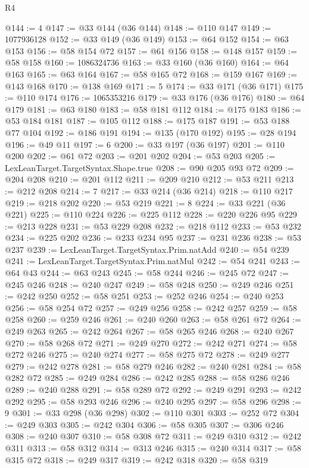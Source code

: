 \begin{lexlean}{R4}
\begin{coremodule}
@144 := 4
@147 := @33 @144 (@36 @144)
@148 := @110 @147
@149 := 1077936128
@152 := @33 @149 (@36 @149)
@153 := @64 @152
@154 := @63 @153
@156 := @58 @154 @72
@157 := @61 @156
@158 := @148 @157
@159 := @58 @158
@160 := 1086324736
@163 := @33 @160 (@36 @160)
@164 := @64 @163
@165 := @63 @164
@167 := @58 @165 @72
@168 := @159 @167
@169 := @143 @168
@170 := @138 @169
@171 := 5
@174 := @33 @171 (@36 @171)
@175 := @110 @174
@176 := 1065353216
@179 := @33 @176 (@36 @176)
@180 := @64 @179
@181 := @63 @180
@183 := @58 @181 @112
@184 := @175 @183
@186 := @53 @184 @181
@187 := @105 @112
@188 := @175 @187
@191 := @53 @188 @77 @104
@192 := @186 @191
@194 := @135 (@170 @192)
@195 := @28 @194
@196 := @49 @11
@197 := 6
@200 := @33 @197 (@36 @197)
@201 := @110 @200
@202 := @61 @72
@203 := @201 @202
@204 := @53 @203
@205 := LexLeanTarget.TargetSyntax.Shape.true
@208 := @90 @205 @93 @72
@209 := @204 @208
@210 := @201 @112
@211 := @209 @210
@212 := @53 @211
@213 := @212 @208
@214 := 7
@217 := @33 @214 (@36 @214)
@218 := @110 @217
@219 := @218 @202
@220 := @53 @219
@221 := 8
@224 := @33 @221 (@36 @221)
@225 := @110 @224
@226 := @225 @112
@228 := @220 @226 @95
@229 := @213 @228
@231 := @53 @229 @208
@232 := @218 @112
@233 := @53 @232
@234 := @225 @202
@236 := @233 @234 @95
@237 := @231 @236
@238 := @53 @237
@239 := LexLeanTarget.TargetSyntax.Prim.natAdd
@240 := @54 @239
@241 := LexLeanTarget.TargetSyntax.Prim.natMul
@242 := @54 @241
@243 := @64 @43
@244 := @63 @243
@245 := @58 @244
@246 := @245 @72
@247 := @245 @246
@248 := @240 @247
@249 := @58 @248
@250 := @249 @246
@251 := @242 @250
@252 := @58 @251
@253 := @252 @246
@254 := @240 @253
@256 := @58 @254 @72
@257 := @249 @256
@258 := @242 @257
@259 := @58 @258
@260 := @259 @246
@261 := @240 @260
@263 := @58 @261 @72
@264 := @249 @263
@265 := @242 @264
@267 := @58 @265 @246
@268 := @240 @267
@270 := @58 @268 @72
@271 := @249 @270
@272 := @242 @271
@274 := @58 @272 @246
@275 := @240 @274
@277 := @58 @275 @72
@278 := @249 @277
@279 := @242 @278
@281 := @58 @279 @246
@282 := @240 @281
@284 := @58 @282 @72
@285 := @249 @284
@286 := @242 @285
@288 := @58 @286 @246
@289 := @240 @288
@291 := @58 @289 @72
@292 := @249 @291
@293 := @242 @292
@295 := @58 @293 @246
@296 := @240 @295
@297 := @58 @296
@298 := 9
@301 := @33 @298 (@36 @298)
@302 := @110 @301
@303 := @252 @72
@304 := @249 @303
@305 := @242 @304
@306 := @58 @305
@307 := @306 @246
@308 := @240 @307
@310 := @58 @308 @72
@311 := @249 @310
@312 := @242 @311
@313 := @58 @312
@314 := @313 @246
@315 := @240 @314
@317 := @58 @315 @72
@318 := @249 @317
@319 := @242 @318
@320 := @58 @319

\end{coremodule}
\end{lexlean}
